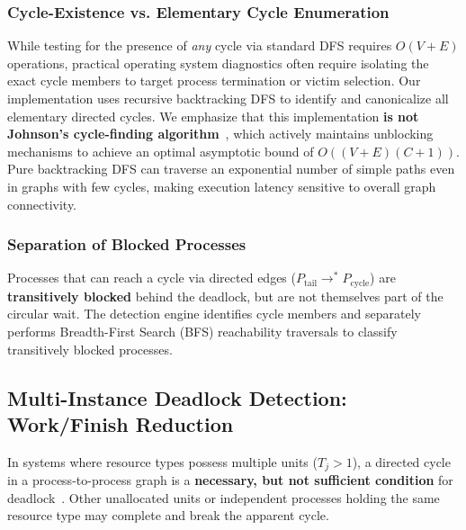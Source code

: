 \documentclass[11pt,a4paper]{article}
\begin{document}
\subsubsection{Cycle-Existence vs. Elementary Cycle Enumeration}
While testing for the presence of \emph{any} cycle via standard DFS requires $O(V + E)$ operations, practical operating system diagnostics often require isolating the exact cycle members to target process termination or victim selection. Our implementation uses recursive backtracking DFS to identify and canonicalize all elementary directed cycles. We emphasize that this implementation \textbf{is not Johnson's cycle-finding algorithm}~\cite{johnson1975finding}, which actively maintains unblocking mechanisms to achieve an optimal asymptotic bound of $O((V + E)(C + 1))$. Pure backtracking DFS can traverse an exponential number of simple paths even in graphs with few cycles, making execution latency sensitive to overall graph connectivity.

\subsubsection{Separation of Blocked Processes}
Processes that can reach a cycle via directed edges ($P_{\text{tail}} \to^* P_{\text{cycle}}$) are \textbf{transitively blocked} behind the deadlock, but are not themselves part of the circular wait. The detection engine identifies cycle members and separately performs Breadth-First Search (BFS) reachability traversals to classify transitively blocked processes.

\subsection{Multi-Instance Deadlock Detection: Work/Finish Reduction}
In systems where resource types possess multiple units ($T_j > 1$), a directed cycle in a process-to-process graph is a \textbf{necessary, but not sufficient condition} for deadlock~\cite{silberschatz2018operating}. Other unallocated units or independent processes holding the same resource type may complete and break the apparent cycle.
\end{document}
